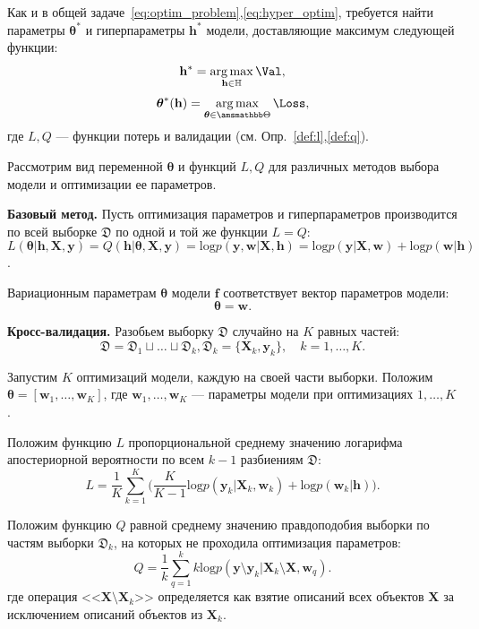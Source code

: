 Как и в общей задаче~\eqref{eq:optim_problem},\eqref{eq:hyper_optim}, 
требуется найти параметры ${\boldsymbol{\theta}}^{*}$ и гиперпараметры $\mathbf{h}^{*}$ модели, доставляющие максимум следующей функции:
\begin{equation}
\label{eq:main}
    \mathbf{h}^{*} = \argmax_{\mathbf{h} \in \mathbb{H}} \Val,
\end{equation}
\begin{equation}
\label{eq:main2}
	\boldsymbol{\theta}^{*}(\mathbf{h}) =  \argmax_{\boldsymbol{\theta} \in \Tetab} \Loss,
\end{equation}
где $L,Q$ --- функции потерь и валидации (см. Опр.~\ref{def:l},\ref{def:q}).

Рассмотрим вид переменной $\boldsymbol{\theta}$ и функций $L, Q$ для различных методов выбора модели и оптимизации ее параметров.

\textbf{Базовый метод. }
Пусть оптимизация параметров и гиперпараметров производится по всей выборке $\mathfrak{D}$ по одной и той же функции $L=Q$:
$$L(\boldsymbol{\theta}|  \mathbf{h},  \mathbf{X}, \mathbf{y}) = Q(\mathbf{h}|  \boldsymbol{\theta}, \mathbf{X}, \mathbf{y} ) = \text{log}p(\mathbf{y}, \mathbf{w} | \mathbf{X}, \mathbf{h}) = \text{log} p(\mathbf{y}|\mathbf{X}, \mathbf{w})+\text{log}p(\mathbf{w}|\mathbf{h})$$.

Вариационным параметрам $\boldsymbol{\theta}$ модели $\mathbf{f}$  соответствует вектор параметров модели: 
\[
\boldsymbol{\theta} = \mathbf{w}.
\]

\textbf{Кросс-валидация. }
Разобьем выборку $\mathfrak{D}$ случайно на $K$ равных частей:
\[
\mathfrak{D} = \mathfrak{D}_1 \sqcup \dots \sqcup \mathfrak{D}_k, \mathfrak{D}_k = \{\mathbf{X}_k, \mathbf{y}_k\}, \quad k=1,\dots,K.
\]


Запустим $K$ оптимизаций модели, каждую на своей части выборки. Положим $\boldsymbol{\theta} = [\mathbf{w}_1, \dots, \mathbf{w}_K]$, где $\mathbf{w}_1, \dots, \mathbf{w}_K$ --- параметры модели при оптимизациях $1, \dots, K$.
 
Положим функцию $L$ пропорциональной  среднему значению логарифма апостериорной вероятности по всем $k-1$ разбиениям $\mathfrak{D}$:
\begin{equation}
L = \frac{1}{K}\sum_{k=1}^K \bigl(\frac{K}{K-1}\text{log}p(\mathbf{y}_k|\mathbf{X}_k, \mathbf{w}_k) + \text{log}p(\mathbf{w}_k|\mathbf{h})\bigr).
\label{eq:cv}
\end{equation}

Положим функцию $Q$ равной среднему значению правдоподобия выборки по частям выборки $\mathfrak{D}_k$, на которых не проходила оптимизация параметров:
\[
Q = \frac{1}{k}\sum_{q=1}^k k\text{log}p(\mathbf{y} \setminus \mathbf{y}_k|\mathbf{X}_k \setminus \mathbf{X}, \mathbf{w}_q).
\]
где операция <<$\mathbf{X} \setminus \mathbf{X}_k$>> определяется как взятие описаний всех объектов $\mathbf{X}$ за исключением описаний объектов из $\mathbf{X}_k$.


